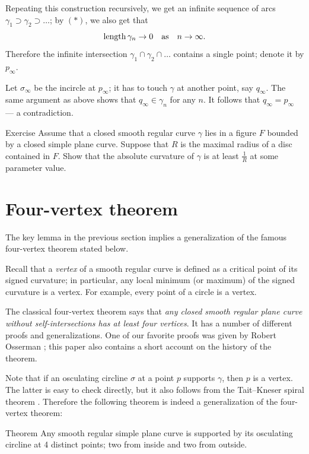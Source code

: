 \documentclass{article}
\begin{document}
Repeating this construction recursively,
we get an infinite sequence of arcs $\gamma_1\supset \gamma_2\supset\dots$;
by $({*})$, we also get that 
\[\mathop{\rm length}\nolimits\gamma_n\to0\quad\text{as}\quad n\to\infty.\] 
Therefore the infinite intersection $\gamma_1\cap\gamma_2\cap\dots$
contains a single point; denote it by $p_\infty$.

Let $\sigma_\infty$ be the incircle at $p_\infty$; it has to touch $\gamma$ at another point, say $q_\infty$.
The same argument as above shows that $q_\infty\in\gamma_n$ for any $n$.
It follows that $q_\infty =p_\infty$ --- a contradiction.
\qeds

\begin{thm}{Exercise}\label{ex:moon-rad}
Assume that a closed smooth regular curve $\gamma$ lies in a figure $F$ bounded by a closed simple plane curve.
Suppose that $R$ is the maximal radius of a disc contained in $F$.
Show that the absolute curvature of $\gamma$ is at least $\tfrac1R$ at some parameter value.
\end{thm}


\section*{Four-vertex theorem}


The key lemma in the previous section implies a generalization of the famous four-vertex theorem stated below.

Recall that a \emph{vertex} of a smooth regular curve is defined as a critical point of its signed curvature;
in particular, any local minimum (or maximum) of the signed curvature is a vertex.
For example, every point of a circle is a vertex.

The classical four-vertex theorem says that \emph{any closed smooth regular plane curve without self-intersections has at least four vertices}.
It has a number of different proofs and generalizations.
One of our favorite proofs was given by Robert Osserman \cite{osserman}; this paper also contains a short account on the history of the theorem.

Note that if an osculating circline $\sigma$ at a point $p$ supports $\gamma$, then $p$ is a vertex.
The latter is easy to check directly, but it also follows from the Tait--Kneser spiral theorem \cite{ghys-tabachnikov-timorin}.
Therefore the following theorem is indeed a generalization of the four-vertex theorem:

\begin{thm}{Theorem}\label{thm:4-vert}
Any smooth regular simple plane curve is supported by its osculating circline at 4 distinct points; two from inside and two from outside.
\end{thm}
\end{document}
